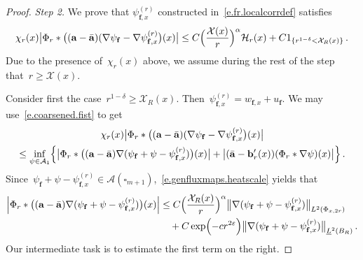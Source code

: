 \documentclass[11pt]{article} %
\let\oldsquare\square %
\renewcommand{\square}{\oldsquare}
\numberwithin{equation}{section}
\theoremstyle{definition}
\newcommand{\eps}{\varepsilon}
\renewcommand{\b}{\ensuremath{\mathbf{b}}}
\newcommand{\f}{\mathbf{f}}
\newcommand{\ep}{\eps}
\renewcommand{\a}{\mathbf{a}}
\newcommand{\ahom}{\bar{\a}}
\newcommand{\cu}{\square}
\newcommand{\X}{\mathcal{X}}
\newcommand{\indc}{1}
\newcommand{\minscale}{\chi}
\newcommand{\A}{\mathcal{A}}
\begin{document}
\begin{proof}
\smallskip

\emph{Step 2.} We prove that $\psi_{\f,x}^{(r)}$ constructed in~\eqref{e.fr.localcorrdef} satisfies
\begin{equation}  \label{e.fr.correctorloc.pre}
\minscale_{r}(x) 
\bigl| 
\Phi_r \ast  \bigl( (\a - \ahom)( \nabla \psi_{\f}  -  \nabla \psi_{\f,x}^{(r)}  \bigr) (x) 
\bigr| 
\\ 
\leq
C \Bigl( \frac{\X(x)}{r} \Bigr)^{\alpha}  \mathcal{H}_r(x) 
+ C  \indc_{\{ r^{1-\delta} < \X_{R}(x) \}}
\,.
\end{equation}
Due to the presence of~$\minscale_{r}(x)$ above, we assume during the rest of the step that~$r \geq \X(x)$. 

\smallskip

Consider first the case~$ r^{1-\delta} \geq \X_{R}(x)$. Then~$\psi_{\f,x}^{(r)} = w_{\f,x} + u_{\f}$.  We may use~\eqref{e.coarsened.fist} to get
\begin{multline}   \label{e.fr.correctorloc.pre0}
\minscale_{r}(x)  
\bigl| 
\Phi_r \ast  \bigl( (\a - \ahom)( \nabla \psi_{\f}  -  \nabla \psi_{\f,x}^{(r)}  \bigr) (x) 
\bigr| 
\\ 
\leq 
\inf_{\psi \in \A_1} 
\Bigl\{ 
\bigl| 
\Phi_r \ast  \bigl(  (\a - \ahom) \nabla (\psi_{\f}  + \psi -  \psi_{\f,x}^{(r)})  \bigr)(x) 
\bigr| 
+
\bigl|  (\ahom - \b_{r}'(x)) (\Phi_r \ast \nabla \psi)(x) \bigr| 
\Bigr\}
\,.
\end{multline}
Since~$\psi_{\f}  + \psi -  \psi_{\f,x}^{(r)} \in \A(\cu_{m+1})$,~\eqref{e.genfluxmaps.heatscale} yields that
\begin{align}  \label{e.fr.correctorloc.pre1}
\Bigl| 
\Phi_r \ast  \bigl(  (\a - \ahom) \nabla (\psi_{\f}  + \psi -  \psi_{\f,x}^{(r)})  \bigr)(x) 
\Bigr| 
& 
\leq 
C \Bigl( \frac{\X_R(x)}{r} \Bigr)^\alpha \big\| \nabla (\psi_{\f}  + \psi -  \psi_{\f,x}^{(r)} )\big\|_{L^2(\Phi_{x,2r})} 
\notag \\ 
&  
\quad 
+ 
C \exp\Bigl( - c r^{2\ep} \Bigr)\big\| \nabla (\psi_{\f}  + \psi -  \psi_{\f,x}^{(r)})\big\|_{\underline{L}^2(B_{R})} 
\,.
\end{align}
Our intermediate task is to estimate the first term on the right.  

\smallskip


\end{proof}
\end{document}
